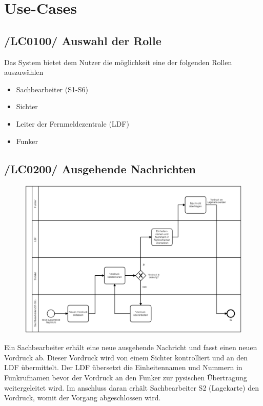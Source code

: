 \section{Use-Cases}

\subsection{/LC0100/ Auswahl der Rolle}
Das System bietet dem Nutzer die möglichkeit eine der folgenden Rollen auszuwählen
\begin{itemize}
\item Sachbearbeiter (S1-S6)
\item Sichter
\item Leiter der Fernmeldezentrale (LDF)
\item Funker
\end{itemize}

 
\newpage
\subsection{/LC0200/ Ausgehende Nachrichten}

\begin{figure}[htpb]
	\centering
	\includegraphics[width=0.95\linewidth]{ausgehend.png}
\end{figure}
\FloatBarrier

Ein Sachbearbeiter erhält eine neue ausgehende Nachricht und fasst einen neuen Vordruck ab. Dieser Vordruck wird von einem Sichter kontrolliert
und an den LDF übermittelt. Der LDF übersetzt die Einheitennamen und Nummern in Funkrufnamen bevor der Vordruck an
den Funker zur pysischen Übertragung weitergeleitet wird. Im anschluss daran erhält Sachbearbeiter S2 (Lagekarte) den Vordruck, womit der Vorgang
abgeschlossen wird.

